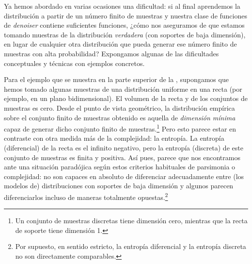 \documentclass[../../book-main.tex]{subfiles}
\begin{document}
Ya hemos abordado en varias ocasiones una dificultad: si al final
aprendemos la distribución a partir de un número finito de muestras y nuestra
clase de funciones de \textit{denoiser} contiene suficientes funciones, ¿cómo
nos aseguramos de que estamos tomando muestras de la distribución \textit{verdadera} (con
soportes de baja dimensión), en lugar de cualquier otra distribución que pueda
generar ese número finito de muestras con alta probabilidad? Expongamos
algunas de las dificultades conceptuales y técnicas con ejemplos concretos.

\begin{example}\label{eg:measures-of-complexity}
    Para el ejemplo que se muestra en la parte superior de la , supongamos
    que hemos tomado algunas muestras de una distribución uniforme en una recta
    (por ejemplo, en un plano bidimensional). El volumen de la recta y de los conjuntos de muestras es cero.
    Desde el punto de vista geométrico, la distribución empírica sobre el conjunto finito de muestras 
    obtenido es aquella de {\em dimensión mínima} capaz de generar
    dicho conjunto finito de muestras.\footnote{Un conjunto de muestras discretas tiene
    dimensión cero, mientras que la recta de soporte tiene dimensión 1.}
    Pero esto parece estar en contraste con otra medida más de
    la complejidad: la entropía. La entropía (diferencial) de la recta es
    el infinito negativo, pero la entropía (discreta) de este conjunto de muestras
    es finita y positiva. Así pues, parece que nos encontramos ante una situación paradójica
    según estos criterios habituales de parsimonia o
    complejidad: no son capaces en absoluto de diferenciar adecuadamente entre (los modelos de)
    distribuciones con soportes de baja dimensión y algunos parecen
    diferenciarlos incluso de maneras totalmente opuestas.\footnote{Por supuesto, en sentido estricto, la
    entropía diferencial y la entropía discreta no son directamente comparables.}
\end{example}
\end{document}
